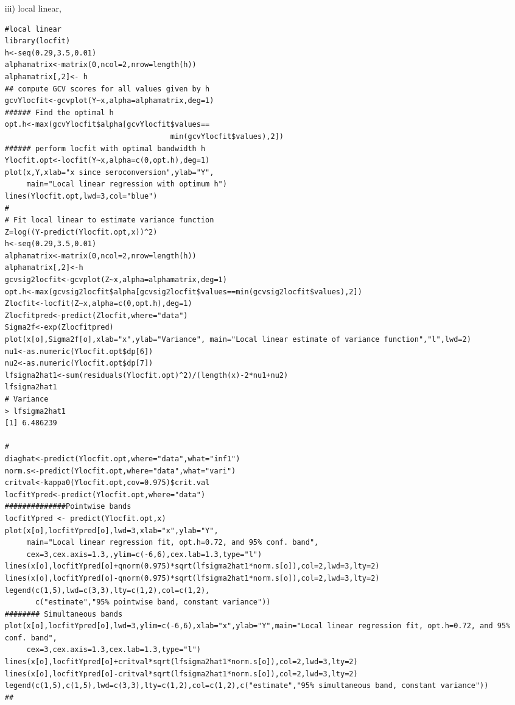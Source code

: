 \documentclass[11pt]{report}
\begin{document}
\begin{itemize}
\item[iii) ] local linear,
\begin{verbatim}
#local linear
library(locfit)
h<-seq(0.29,3.5,0.01)
alphamatrix<-matrix(0,ncol=2,nrow=length(h))
alphamatrix[,2]<- h
## compute GCV scores for all values given by h
gcvYlocfit<-gcvplot(Y~x,alpha=alphamatrix,deg=1)
###### Find the optimal h
opt.h<-max(gcvYlocfit$alpha[gcvYlocfit$values==
                                      min(gcvYlocfit$values),2])
###### perform locfit with optimal bandwidth h
Ylocfit.opt<-locfit(Y~x,alpha=c(0,opt.h),deg=1)
plot(x,Y,xlab="x since seroconversion",ylab="Y",
     main="Local linear regression with optimum h")
lines(Ylocfit.opt,lwd=3,col="blue")
#
# Fit local linear to estimate variance function
Z=log((Y-predict(Ylocfit.opt,x))^2)
h<-seq(0.29,3.5,0.01)
alphamatrix<-matrix(0,ncol=2,nrow=length(h))
alphamatrix[,2]<-h
gcvsig2locfit<-gcvplot(Z~x,alpha=alphamatrix,deg=1) 
opt.h<-max(gcvsig2locfit$alpha[gcvsig2locfit$values==min(gcvsig2locfit$values),2])
Zlocfit<-locfit(Z~x,alpha=c(0,opt.h),deg=1)
Zlocfitpred<-predict(Zlocfit,where="data") 
Sigma2f<-exp(Zlocfitpred)
plot(x[o],Sigma2f[o],xlab="x",ylab="Variance", main="Local linear estimate of variance function","l",lwd=2)
nu1<-as.numeric(Ylocfit.opt$dp[6])
nu2<-as.numeric(Ylocfit.opt$dp[7]) 
lfsigma2hat1<-sum(residuals(Ylocfit.opt)^2)/(length(x)-2*nu1+nu2)
lfsigma2hat1
# Variance
> lfsigma2hat1
[1] 6.486239

#
diaghat<-predict(Ylocfit.opt,where="data",what="inf1")
norm.s<-predict(Ylocfit.opt,where="data",what="vari") 
critval<-kappa0(Ylocfit.opt,cov=0.975)$crit.val 
locfitYpred<-predict(Ylocfit.opt,where="data")
##############Pointwise bands
locfitYpred <- predict(Ylocfit.opt,x)
plot(x[o],locfitYpred[o],lwd=3,xlab="x",ylab="Y",
     main="Local linear regression fit, opt.h=0.72, and 95% conf. band",
     cex=3,cex.axis=1.3,,ylim=c(-6,6),cex.lab=1.3,type="l") 
lines(x[o],locfitYpred[o]+qnorm(0.975)*sqrt(lfsigma2hat1*norm.s[o]),col=2,lwd=3,lty=2)
lines(x[o],locfitYpred[o]-qnorm(0.975)*sqrt(lfsigma2hat1*norm.s[o]),col=2,lwd=3,lty=2) 
legend(c(1,5),lwd=c(3,3),lty=c(1,2),col=c(1,2),
       c("estimate","95% pointwise band, constant variance"))
######## Simultaneous bands
plot(x[o],locfitYpred[o],lwd=3,ylim=c(-6,6),xlab="x",ylab="Y",main="Local linear regression fit, opt.h=0.72, and 95% conf. band",
     cex=3,cex.axis=1.3,cex.lab=1.3,type="l")
lines(x[o],locfitYpred[o]+critval*sqrt(lfsigma2hat1*norm.s[o]),col=2,lwd=3,lty=2)
lines(x[o],locfitYpred[o]-critval*sqrt(lfsigma2hat1*norm.s[o]),col=2,lwd=3,lty=2)
legend(c(1,5),c(1,5),lwd=c(3,3),lty=c(1,2),col=c(1,2),c("estimate","95% simultaneous band, constant variance"))                                      
##
\end{verbatim}


\end{itemize}
\end{document}
